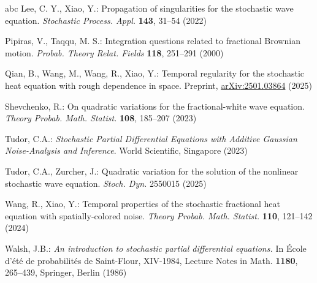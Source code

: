 \documentclass[11pt,reqno]{amsart}
\numberwithin{equation}{section}
\newcommand{\1}{{\bf 1}}
\newcommand{\2}{{\bf 2}}
\begin{document}
\begin{thebibliography}{abc}
Lee, C. Y., Xiao, Y.: Propagation of singularities for the stochastic wave equation.  \textit{Stochastic Process. Appl.} \textbf{143}, 31--54 (2022)

   
 
 

Pipiras, V., Taqqu, M. S.: Integration questions related to fractional Brownian motion. 
\textit{Probab. Theory Relat. Fields} \textbf{118}, 251--291 (2000)

 

Qian, B., Wang, M., Wang, R., Xiao, Y.: Temporal regularity for the stochastic heat equation with rough dependence in space. 
Preprint, \href{https://arxiv.org/abs/2501.03864}{arXiv:2501.03864} (2025)

 
 

Shevchenko, R.: On quadratic variations for the fractional-white wave equation. 
\textit{Theory Probab. Math. Statist.} \textbf{108}, 185--207 (2023)

Tudor, C.A.: \textit{Stochastic Partial Differential Equations with Additive Gaussian Noise-Analysis and Inference}.  
World Scientific, Singapore (2023)

Tudor, C.A., Zurcher, J.: Quadratic variation for the solution of the nonlinear stochastic wave equation. 
\textit{Stoch. Dyn.} 2550015 (2025)
 

Wang, R., Xiao, Y.: Temporal properties of the stochastic fractional heat equation with spatially-colored noise. 
\textit{Theory Probab. Math. Statist.} \textbf{110}, 121--142 (2024)

 
 Walsh, J.B.: {\it An introduction to stochastic partial differential equations.}
 In  \'{E}cole d'\'{e}t\'{e} de probabilit\'{e}s de Saint-Flour, XIV-1984,
  Lecture Notes in Math. {\bf 1180}, 265--439, Springer, Berlin (1986)
 
 
 
     \end{thebibliography}
\vskip0.8cm



    
\end{document}
